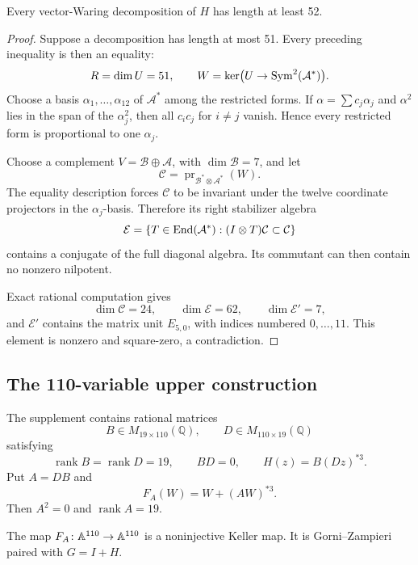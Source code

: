 \documentclass[11pt,reqno]{amsart}
\begin{document}
\begin{proposition}
\label{prop:waring52}
Every vector-Waring decomposition of \(H\) has length at least 52.
\end{proposition}

\begin{proof}
Suppose a decomposition has length at most 51.  Every preceding inequality is
then an equality:
\[
R=\dim U=51,\qquad W=\ker\bigl(U\to\operatorname{Sym}^2(\mathcal A^*)\bigr).
\]
Choose a basis
\(\alpha_1,\ldots,\alpha_{12}\) of \(\mathcal A^*\) among the restricted
forms.  If
\(\alpha=\sum c_j\alpha_j\) and
\(\alpha^2\) lies in the span of the \(\alpha_j^2\), then all
\(c_ic_j\) for \(i\ne j\) vanish.  Hence every restricted form is
proportional to one \(\alpha_j\).

Choose a complement \(V=\mathcal B\oplus\mathcal A\), with
\(\dim\mathcal B=7\), and let
\[
\mathcal C=
\operatorname{pr}_{\mathcal B^*\otimes\mathcal A^*}(W).
\]
The equality description forces \(\mathcal C\) to be invariant under the
twelve coordinate projectors in the \(\alpha_j\)-basis.  Therefore its right
stabilizer algebra
\[
\mathcal E=
\left\{T\in\operatorname{End}(\mathcal A^*):
(I\otimes T)\mathcal C\subset\mathcal C\right\}
\]
contains a conjugate of the full diagonal algebra.  Its commutant can then
contain no nonzero nilpotent.

Exact rational computation gives
\[
\dim\mathcal C=24,\qquad
\dim\mathcal E=62,\qquad
\dim\mathcal E'=7,
\]
and \(\mathcal E'\) contains the matrix unit \(E_{5,0}\), with indices
numbered \(0,\ldots,11\).  This element is nonzero and square-zero, a
contradiction.
\end{proof}

\subsection{The 110-variable upper construction}

The supplement contains rational matrices
\[
B\in M_{19\times110}(\mathbb Q),\qquad
D\in M_{110\times19}(\mathbb Q)
\]
satisfying
\begin{equation}
\label{eq:pair-data}
\operatorname{rank}B=\operatorname{rank}D=19,\qquad
BD=0,\qquad
H(z)=B(Dz)^{*3}.
\end{equation}
Put \(A=DB\) and
\[
F_A(W)=W+(AW)^{*3}.
\]
Then \(A^2=0\) and \(\operatorname{rank}A=19\).

\begin{proposition}
\label{prop:pair110}
The map \(F_A\colon\mathbb A^{110}\to\mathbb A^{110}\) is a noninjective Keller map.
It is Gorni--Zampieri paired with \(G=I+H\).
\end{proposition}
\end{document}
